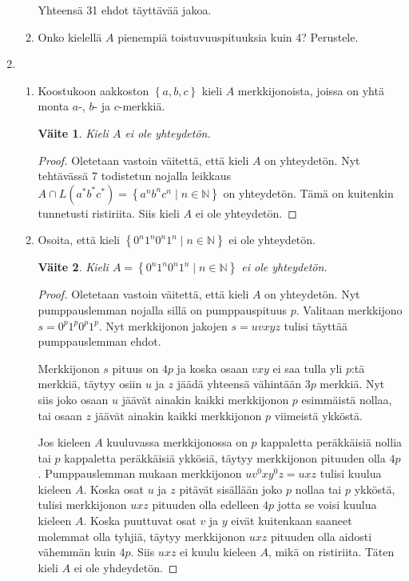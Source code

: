 \documentclass[a4paper,11pt, draft]{article}
\newtheorem*{claim}{Väite}
\newcommand{\set}[1]{{\left\{ #1 \right\}}}
\newcommand{\Nat}{\mathbb{N}}
\begin{document}
\begin{enumerate}
\begin{enumerate}
      Yhteensä 31 ehdot täyttävää jakoa.

    \item
      Onko kielellä $A$ pienempiä toistuvuuspituuksia kuin 4? Perustele.
    \end{enumerate}

  \item
    \begin{enumerate}
      \item
        Koostukoon aakkoston $\set{a,b,c}$ kieli $A$ merkkijonoista, joissa on
        yhtä monta $a$-, $b$- ja $c$-merkkiä.
        \begin{claim}
          Kieli $A$ ei ole yhteydetön.
        \end{claim}
        \begin{proof}
          Oletetaan vastoin väitettä, että kieli $A$ on yhteydetön. Nyt
          tehtävässä 7 todistetun nojalla leikkaus $A \cap L(a^*b^*c^*) =
          \set{a^nb^nc^n \mid n \in \Nat}$ on yhteydetön. Tämä on kuitenkin
          tunnetusti ristiriita. Siis kieli $A$ ei ole yhteydetön.
        \end{proof}

      \item
        Osoita, että kieli $\set{0^n1^n0^n1^n \mid n \in \Nat}$ ei ole
        yhteydetön.
        \begin{claim}
          Kieli $A = \set{0^n1^n0^n1^n \mid n \in \Nat}$ ei ole yhteydetön.
        \end{claim}
        \begin{proof}
          Oletetaan vastoin väitettä, että kieli $A$ on yhteydetön. Nyt
          pumppauslemman nojalla sillä on pumppauspituus $p$. Valitaan
          merkkijono $s = 0^p1^p0^p1^p$. Nyt merkkijonon jakojen $s = uvxyz$
          tulisi täyttää pumppauslemman ehdot.

          Merkkijonon $s$ pituus on $4p$ ja koska osaan $vxy$ ei saa tulla yli
          $p$:tä merkkiä, täytyy osiin $u$ ja $z$ jäädä yhteensä vähintään
          $3p$ merkkiä. Nyt siis joko osaan $u$ jäävät ainakin kaikki
          merkkijonon $p$ esimmäistä nollaa, tai osaan $z$ jäävät ainakin
          kaikki merkkijonon $p$ viimeistä ykköstä.

          Jos kieleen $A$ kuuluvassa merkkijonossa on $p$ kappaletta
          peräkkäisiä nollia tai $p$ kappaletta peräkkäisiä ykkösiä, täytyy
          merkkijonon pituuden olla $4p$. Pumppauslemman mukaan merkkijonon
          $uv^0xy^0z = uxz$ tulisi kuulua kieleen $A$. Koska osat $u$ ja $z$
          pitävät sisällään joko $p$ nollaa tai $p$ ykköstä, tulisi
          merkkijonon $uxz$ pituuden olla edelleen $4p$ jotta se voisi kuulua
          kieleen $A$. Koska puuttuvat osat $v$ ja $y$ eivät kuitenkaan
          saaneet molemmat olla tyhjiä, täytyy merkkijonon $uxz$ pituuden olla
          aidosti vähemmän kuin $4p$. Siis $uxz$ ei kuulu kieleen $A$, mikä on
          ristiriita. Täten kieli $A$ ei ole yhdeydetön.
        \end{proof}
    \end{enumerate}


\end{enumerate}
\end{document}
